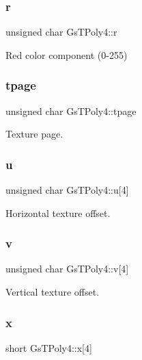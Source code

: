 \subsubsection{\texorpdfstring{r}{r}}
{\footnotesize\ttfamily unsigned char Gs\+T\+Poly4\+::r}



Red color component (0-\/255) 

\mbox{\label{structGsTPoly4_a1a79cc052f1e999badbd984ea7860b54}} 
\subsubsection{\texorpdfstring{tpage}{tpage}}
{\footnotesize\ttfamily unsigned char Gs\+T\+Poly4\+::tpage}



Texture page. 

\mbox{\label{structGsTPoly4_a92294b5e2be9cab5b87149fa8840ce77}} 
\subsubsection{\texorpdfstring{u}{u}}
{\footnotesize\ttfamily unsigned char Gs\+T\+Poly4\+::u\mbox{[}4\mbox{]}}



Horizontal texture offset. 

\mbox{\label{structGsTPoly4_a76767d49028942c4e3d7aa0d54b60ee7}} 
\subsubsection{\texorpdfstring{v}{v}}
{\footnotesize\ttfamily unsigned char Gs\+T\+Poly4\+::v\mbox{[}4\mbox{]}}



Vertical texture offset. 

\mbox{\label{structGsTPoly4_a6348d047a5123bf2c7b6d70d96d216ae}} 
\subsubsection{\texorpdfstring{x}{x}}
{\footnotesize\ttfamily short Gs\+T\+Poly4\+::x\mbox{[}4\mbox{]}}



